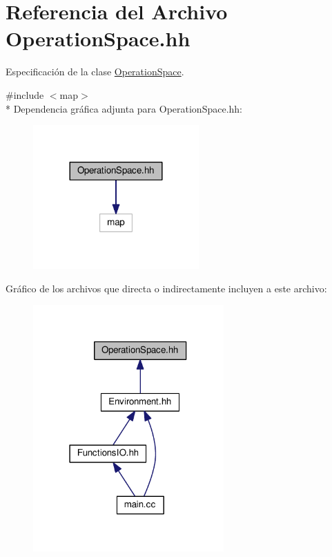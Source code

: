 \hypertarget{_operation_space_8hh}{}\section{Referencia del Archivo Operation\+Space.\+hh}
\label{_operation_space_8hh}


Especificación de la clase \hyperlink{class_operation_space}{Operation\+Space}.  


{\ttfamily \#include $<$map$>$}\\*
Dependencia gráfica adjunta para Operation\+Space.\+hh\+:\nopagebreak
\begin{figure}[H]
\begin{center}
\leavevmode
\includegraphics[width=180pt]{_operation_space_8hh__incl}
\end{center}
\end{figure}
Gráfico de los archivos que directa o indirectamente incluyen a este archivo\+:\nopagebreak
\begin{figure}[H]
\begin{center}
\leavevmode
\includegraphics[width=207pt]{_operation_space_8hh__dep__incl}
\end{center}
\end{figure}
